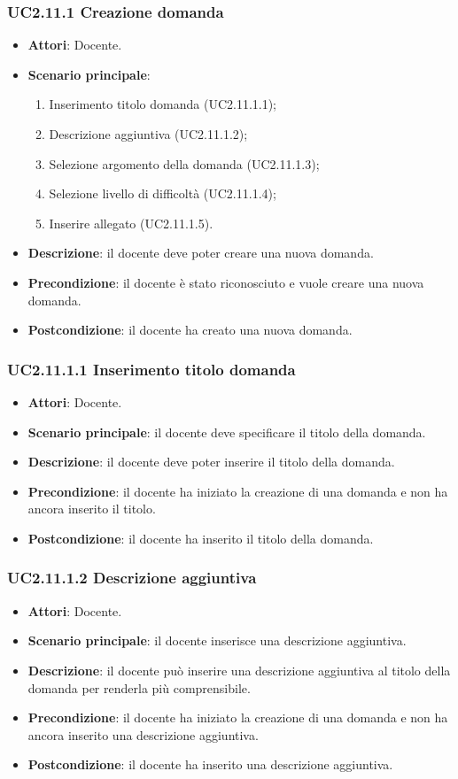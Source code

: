 \subsubsection{UC2.11.1 Creazione domanda}
\begin{itemize}
\item \textbf{Attori}: Docente.
\item \textbf{Scenario principale}:
\begin{enumerate}
\item Inserimento titolo domanda (UC2.11.1.1);
\item Descrizione aggiuntiva (UC2.11.1.2);
\item Selezione argomento della domanda (UC2.11.1.3);
\item Selezione livello di difficoltà (UC2.11.1.4);
\item Inserire allegato (UC2.11.1.5).
\end{enumerate}
\item \textbf{Descrizione}: il docente deve poter creare una nuova domanda.
\item \textbf{Precondizione}: il docente è stato riconosciuto e vuole creare una nuova domanda.
\item \textbf{Postcondizione}: il docente ha creato una nuova domanda.
\end{itemize}
\subsubsection{UC2.11.1.1 Inserimento titolo domanda}
\begin{itemize}
\item \textbf{Attori}: Docente.
\item \textbf{Scenario principale}: il docente deve specificare il titolo della domanda.
\item \textbf{Descrizione}: il docente deve poter inserire il titolo della domanda.
\item \textbf{Precondizione}: il docente ha iniziato la creazione di una domanda e non ha ancora inserito il titolo.
\item \textbf{Postcondizione}: il docente ha inserito il titolo della domanda.
\end{itemize}
\subsubsection{UC2.11.1.2 Descrizione aggiuntiva}
\begin{itemize}
\item \textbf{Attori}: Docente.
\item \textbf{Scenario principale}: il docente inserisce una descrizione aggiuntiva.
\item \textbf{Descrizione}: il docente può inserire una descrizione aggiuntiva al titolo della domanda per renderla più comprensibile.
\item \textbf{Precondizione}: il docente ha iniziato la creazione di una domanda e non ha ancora inserito una descrizione aggiuntiva.
\item \textbf{Postcondizione}: il docente ha inserito una descrizione aggiuntiva.
\end{itemize}
